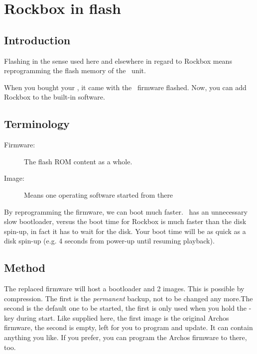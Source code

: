 \section{\label{ref:Rockboxinflash}Rockbox in flash}


\subsection{Introduction}
Flashing in the sense used here and elsewhere in regard to Rockbox means 
reprogramming the flash memory of the \playerman\ unit.

When you bought your \playerman, it came with the \playerman\ firmware flashed.
Now, you can add Rockbox to the built-in software.

\subsection{Terminology}
\begin{description}
\item[Firmware: ] The flash ROM content as a whole.
\item[Image: ] Means one operating software started from there
\end{description}

By reprogramming the firmware, we can boot much faster. \playerman\ has an 
unnecessary slow bootloader, versus the boot time for Rockbox is much faster 
than the disk spin-up, in fact it has to wait for the disk. Your boot time will 
be as quick as a disk spin-up (e.g. 4 seconds from power-up until resuming 
playback).

\subsection{Method}

The replaced firmware will host a bootloader and 2 images. This is possible by 
compression. The first is the \emph{permanent} backup, not to be changed any 
more.The second is the default one to be started, the first is only used when 
you hold the  -key during start. Like supplied here, the first image 
is the original Archos firmware, the second is empty, left for you to program 
and update. It can contain anything you like. If you prefer, you can program 
the Archos firmware to there, too.

